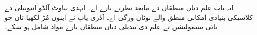 \documentclass[../../../include/open-logic-chapter]{subfiles}
\begin{document}

\begin{editorial}
  ایہ باب علم دیاں منطقاں دے مابعد نظریے بارے اے۔ ایہدی بناوٹ آلڈو
  انتونیلی دے کلاسیکی بنیادی امکانی منطق والے نوٹاں ورگی اے۔ آڈری یاپ
  نے اینوں مُڑ لکھیا تاں جو بائی سیمولیشن تے علم دی تبدیلی دیاں منطقاں
  بارے مواد شامل ہو سکے۔
\end{editorial}


\OLEndPartHook
\end{document}

